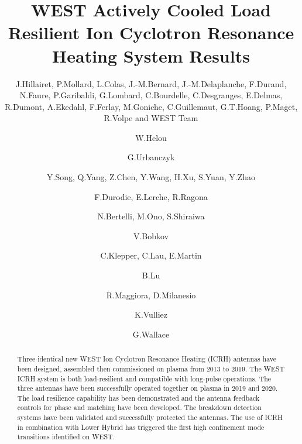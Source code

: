 \documentclass[12p]{iopart}
\begin{document}
\title[WEST ICRH System Results]{WEST Actively Cooled Load Resilient Ion Cyclotron Resonance Heating System Results}

\author{J.Hillairet, P.Mollard, L.Colas, J.-M.Bernard, J.-M.Delaplanche, F.Durand, N.Faure, P.Garibaldi, G.Lombard, C.Bourdelle, C.Desgranges, E.Delmas, R.Dumont, A.Ekedahl, F.Ferlay, M.Goniche, C.Guillemaut, G.T.Hoang, P.Maget, R.Volpe and WEST Team}
\address{CEA, IRFM,	F-13108 St-Paul-Lez-Durance, France}

\author{W.Helou}
\address{Iter Organization
Route De Vinon-Sur-Verdon, Cs 90 046, 13067 St. Paul Lez Durance Cedex, France}

\author{G.Urbanczyk}
\address{Key Laboratory Of Optoelectronic Devices And Systems, College Of Physics And Optoelectronic Engineering
Shenzhen University, Shenzhen 518060, China}

\author{Y.Song, Q.Yang, Z.Chen, Y.Wang, H.Xu, S.Yuan, Y.Zhao}
\address{Institute Of Plasma Physics, Cas
Hefei, Anhui 230031, Pr China}

\author{F.Durodie, E.Lerche, R.Ragona}
\address{Laboratory For Plasma Physics, Royal Military Academy 
1000 Bruxelles, Belgium}

\author{N.Bertelli, M.Ono, S.Shiraiwa}
\address{Princeton Plasma Physics Laboratory
Princeton, Nj 08543, Usa}

\author{V.Bobkov}
\address{Max-Planck Institut Für Plasmaphysik
Boltzmannstraße 2, 85748 Garching, Germany}

\author{C.Klepper, C.Lau, E.Martin}
\address{Oak Ridge National Laboratory
1 Bethel Valley Rd, Oak Ridge, Tn 37830}

\author{B.Lu}
\address{Southwestern Institute Of Physics 
Po Box 432, Chengdu 610041, Pr China}

\author{R.Maggiora, D.Milanesio}
\address{Politecnico Di Torino, Department Of Electronics And Telecommunications}

\author{K.Vulliez}
\address{Cea, Liten 
F-38054 Grenoble, France}

\author{G.Wallace}
\address{Plasma Science And Fusion Center, Mit 
Cambridge, Ma, 02139, Usa}

\vspace{10pt}

\begin{abstract}
Three identical new WEST Ion Cyclotron Resonance Heating (ICRH) antennas have been designed, assembled then commissioned on plasma from 2013 to 2019. The WEST ICRH system is both load-resilient and compatible with long-pulse operations. The three antennas have been successfully operated together on plasma in 2019 and 2020. The load resilience capability has been demonstrated and the antenna feedback controls for phase and matching have been developed. The breakdown detection systems have been validated and successfully protected the antennas. The use of ICRH in combination with Lower Hybrid has triggered the first high confinement mode transitions identified on WEST.
\end{abstract}
\end{document}

